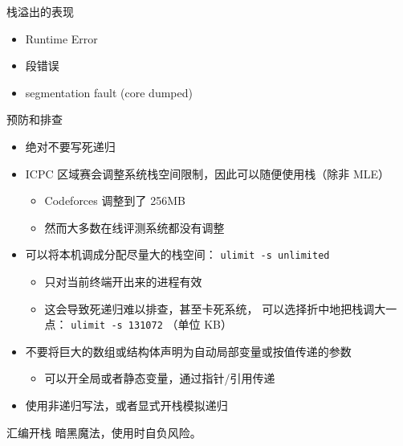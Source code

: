 \documentclass[10pt,mathserif]{beamer}%
\begin{document}
\begin{frame}{栈溢出的表现}
	\begin{itemize}
		\item Runtime Error
		\item 段错误
		\item segmentation fault (core dumped)
	\end{itemize}
\end{frame}

\begin{frame}{预防和排查}
	\begin{itemize}
		\item 绝对不要写死递归
		\item ICPC 区域赛会调整系统栈空间限制，因此可以随便使用栈（除非
			MLE）
			\begin{itemize}
				\item Codeforces 调整到了 256MB
				\item 然而大多数在线评测系统都没有调整
			\end{itemize}
		\item 可以将本机调成分配尽量大的栈空间：
			\lstinline|ulimit -s unlimited|
			\begin{itemize}
				\item 只对当前终端开出来的进程有效
				\item 这会导致死递归难以排查，甚至卡死系统，
					可以选择折中地把栈调大一点：
					\lstinline|ulimit -s 131072| （单位 KB）
			\end{itemize}
		\item 不要将巨大的数组或结构体声明为自动局部变量或按值传递的参数
			\begin{itemize}
				\item 可以开全局或者静态变量，通过指针/引用传递
			\end{itemize}
		\item 使用非递归写法，或者显式开栈模拟递归
	\end{itemize}
\end{frame}

\begin{frame}{汇编开栈}
	暗黑魔法，使用时自负风险。
	
\end{frame}
\end{document}
